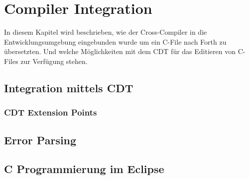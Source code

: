 \chapter{Compiler Integration}

In diesem Kapitel wird beschrieben, wie der Cross-Compiler in die Entwicklungsumgebung eingebunden wurde um ein C-File nach Forth zu übersetzten. Und welche Möglichkeiten mit dem CDT für das Editieren von C-Files zur Verfügung stehen.

\section{Integration mittels CDT}

\subsection{CDT Extension Points}

\section{Error Parsing}

\section{C Programmierung im Eclipse}

